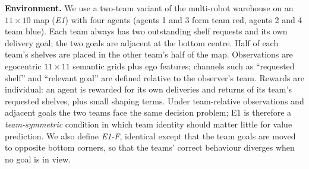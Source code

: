 \documentclass{article}
\begin{document}
\textbf{Environment.} We use a two-team variant of the multi-robot warehouse \cite{papoudakis2021benchmarking} on an
$11\times10$ map (\emph{E1}) with four agents (agents 1 and 3 form team red, agents 2 and 4 team blue). Each team
always has two outstanding shelf requests and its own delivery goal; the two goals are adjacent at the bottom
centre. Half of each team's shelves are placed in the other team's half of the map. Observations are egocentric
$11\times11$ semantic grids plus ego features; channels such as ``requested shelf'' and ``relevant goal'' are
defined relative to the observer's team. Rewards are individual: an agent is rewarded for its own deliveries
and returns of its team's requested shelves, plus small shaping terms. Under team-relative observations and
adjacent goals the two teams face the same decision problem; E1 is therefore a \emph{team-symmetric} condition in
which team identity should matter little for value prediction. We also define \emph{E1-F}, identical except that
the team goals are moved to opposite bottom corners, so that the teams' correct behaviour diverges when no goal is
in view.
\end{document}
